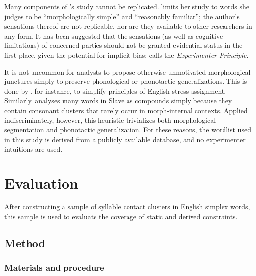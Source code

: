 Many components of \citeauthor{Pierrehumbert1994}'s study cannot be replicated.
\citeauthor{Pierrehumbert1994} limits her study to words she judges to be ``morphologically simple'' and ``reasonably familiar''; the author's sensations thereof are not replicable, nor are they available to other researchers in any form.
It has been suggested \citep[e.g.,][]{Labov1975,Schutze1996} that the sensations (as well as cognitive limitations) of concerned parties should not be granted evidential status in the first place, given the potential for implicit bias; \citeauthor{Labov1975} calls the \emph{Experimenter Principle}.

It is not uncommon for analysts to propose otherwise-unmotivated morphological junctures simply to preserve phonological or phonotactic generalizations.
This is done by \citet{SPE}, for instance, to simplify principles of English stress assignment.
Similarly, \citet[546]{Rice2009d} analyses many words in Slave as compounds simply because they contain consonant clusters that rarely occur in morph-internal contexts.
Applied indiscriminately, however, this heuristic trivializes both morphological segmentation and phonotactic generalization.
For these reasons, the wordlist used in this study is derived from a publicly available database, and no experimenter intuitions are used.

\section{Evaluation}
\label{4evaluation}

After constructing a sample of syllable contact clusters in English simplex words, this sample is used to evaluate the coverage of static and derived constraints.

\subsection{Method}

\subsubsection{Materials and procedure}
\label{sss:map}


